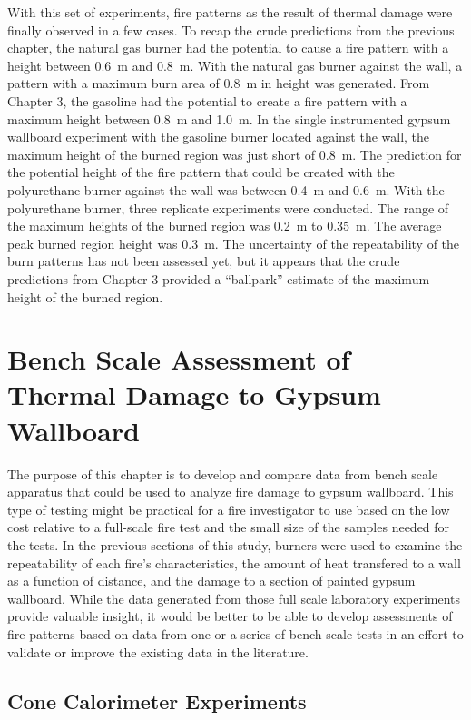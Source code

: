 \documentclass[twoside]{uocthesis}
\begin{document}
{With this set of experiments, fire patterns as the result of thermal damage were finally observed in a few cases.  To recap the crude predictions from the previous chapter, the natural gas burner had the potential to cause a fire pattern with a height between 0.6~m and 0.8~m.  With the natural gas burner against the wall, a pattern with a maximum burn area of 0.8~m in height was generated.  From Chapter 3, the gasoline had the potential to create a fire pattern with a maximum height between 0.8~m and 1.0~m.  In the single instrumented gypsum wallboard experiment with the gasoline burner located against the wall, the maximum height of the burned region was just short of 0.8~m.  The prediction for the potential height of the fire pattern that could be created with the polyurethane burner against the wall was between 0.4~m and 0.6~m.  With the polyurethane burner, three replicate experiments were conducted.  The range of the maximum heights of the burned region was 0.2~m to 0.35~m.  The average peak burned region height was 0.3~m. The uncertainty of the repeatability of the burn patterns has not been assessed yet, but it appears that the crude predictions from Chapter 3 provided a ``ballpark'' estimate of the maximum height of the burned region.      


\chapter{Bench Scale Assessment of Thermal Damage to Gypsum Wallboard}

The purpose of this chapter is to develop and compare data from bench scale apparatus that could be used to analyze fire damage to gypsum wallboard.
This type of testing might be practical for a fire investigator to use based on the low cost relative to a full-scale fire test and the small size of the samples needed for the tests.  In the previous sections of this study, burners were used to examine the repeatability of each fire's characteristics, the amount of heat transfered to a wall as a function of distance, and the damage to a section of painted gypsum wallboard.  While the data generated from those full scale laboratory experiments provide valuable insight, it would be better to be able to develop assessments of fire patterns based on data from one or a series of bench scale tests in an effort to validate or improve the existing data in the literature.       


\section{Cone Calorimeter Experiments}

}
\end{document}
